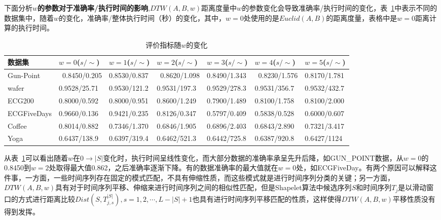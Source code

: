 下面分析\textbf{$w$的参数对于准确率/执行时间的影响},$DTW(A,B,w)$距离度量中$w$的参数变化会导致准确率/执行时间的变化，表~\ref{tab:metricdpw}中表示不同的数据集中，随着$w$的变化，准确率/整体执行时间（秒）的变化，其中，$w=0$处使用的是$Euclid(A,B)$的距离度量，表格中是$w=0$距离计算的执行时间。
\begin{table}[htbp]
	\centering
	\begin{minipage}{\textwidth}
		\caption{评价指标随$w$的变化}
		\label{tab:metricdpw}
		\begin{tabular}{p{1.8cm}p{1.8cm}p{1.8cm}p{1.8cm}p{1.8cm}p{1.8cm}p{1.8cm}}
			\toprule[1.5pt]
			{\heiti 数据集} &{\heiti $w=0$($s/\sim$) } &{\heiti $w=1$($s/\sim$) } &{\heiti $w=2$($s/\sim$) } &{\heiti $w=3$($s/\sim$) } &{\heiti $w=4$($s/\sim$) } &{\heiti $w=5$($s/\sim$) }
			\\\midrule[1pt]
			Gun-Point    & 0.8450/0.205 & 0.8530/0.837 & 0.8620/1.098 & 0.8490/1.343 & 0.8230/1.576 & 0.8170/1.781 \\
			wafer & 0.9528/25.71 & 0.9530/121.2 & 0.9531/197.3 & 0.9529/278.3 & 0.9531/356.7 & 0.9532/432.7 \\
			ECG200 & 0.8000/0.592 & 0.8000/0.951 & 0.8600/1.249 & 0.7900/1.489 & 0.8100/1.758 & 0.8100/2.000 \\
			ECGFiveDays &  0.9660/0.136 & 0.9421/0.235 & 0.8126/0.347 & 0.5797/0.409 & 0.5838/0.528 & 0.6000/0.607 \\
			Coffee & 0.8014/0.882 & 0.7346/1.370 & 0.6846/1.905 &0.6896/2.403 & 0.6843/2.890 & 0.7321/3.417 \\
			Yoga & 0.6437/138.9 & 0.6397/319.4 & 0.6462/521.3 & 0.6442/725.8 & 0.6387/920.8 & 0.6427/1124 \\
			\bottomrule[1.5pt]
		\end{tabular}
	\end{minipage}
\end{table}

从表~\ref{tab:metricdpw}可以看出随着$w$在$ 0 \to |S|$变化时，执行时间呈线性变化，而大部分数据的准确率承呈先升后降，如GUN\_POINT数据，从$w=0$的0.8450到$w=2$处取得最大值0.862，之后准确率逐渐下降。有的数据准确率的最大值就在$w=0$处，如ECGFiveDay。有两个原因可以解释这件事，一方面，一些时间序列存在固定的模式匹配，不具有伸缩性质，而这些模式就是进行时间序列分类的关键；另一方面，$DTW(A,B,w)$具有对于时间序列平移、伸缩来进行时间序列之间的相似性匹配，但是Shapelet算法中候选序列$S$和时间序列$T_j$是以滑动窗口的方式进行距离比较$Dist(S,T_{j,s}^{|S|}),s=1,2,\cdots,L-|S|+1$也具有进行时间序列平移匹配的性质，这样使得$DTW(A,B,w)$平移性质没有得到发挥。

